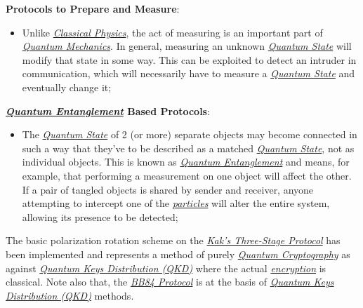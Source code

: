\documentclass[conference]{IEEEtran}
\begin{document}
\vspace{4pt}

\textbf{Protocols to Prepare and Measure}:

\begin{itemize}
    \item Unlike \href{https://en.wikipedia.org/wiki/Classical_physics}{\textit{Classical Physics}}, the act of measuring is an important part of \href{https://en.wikipedia.org/wiki/Quantum_mechanics}{\textit{Quantum Mechanics}}. In general, measuring an unknown \href{https://en.wikipedia.org/wiki/Quantum_state}{\textit{Quantum State}} will modify that state in some way. This can be exploited to detect an intruder in communication, which will necessarily have to measure a \href{https://en.wikipedia.org/wiki/Quantum_state}{\textit{Quantum State}} and eventually change it;
\end{itemize}

\textbf{\href{https://en.wikipedia.org/wiki/Quantum_entanglement}{\textit{Quantum Entanglement}} Based Protocols}:

\begin{itemize}
    \item The \href{https://en.wikipedia.org/wiki/Quantum_state}{\textit{Quantum State}} of 2 (or more) separate objects may become connected in such a way that they've to be described as a matched \href{https://en.wikipedia.org/wiki/Quantum_state}{\textit{Quantum State}}, not as individual objects. This is known as \href{https://en.wikipedia.org/wiki/Quantum_entanglement}{\textit{Quantum Entanglement}} and means, for example, that performing a measurement on one object will affect the other. If a pair of tangled objects is shared by sender and receiver, anyone attempting to intercept one of the \href{https://en.wikipedia.org/wiki/Microparticle}{\textit{particles}} will alter the entire system, allowing its presence to be detected;
\end{itemize}

\vspace{6pt}

The basic polarization rotation scheme on the \href{https://en.wikipedia.org/wiki/Subhash_Kak}{\textit{Kak's Three-Stage Protocol}} has been implemented and represents a method of purely \href{https://en.wikipedia.org/wiki/Quantum_cryptography}{\textit{Quantum Cryptography}} as against \href{https://en.wikipedia.org/wiki/Quantum_key_distribution}{\textit{Quantum Keys Distribution (QKD)}} where the actual \href{https://en.wikipedia.org/wiki/Encryption}{\textit{encryption}} is classical. Note also that, the \href{https://en.wikipedia.org/wiki/BB84}{\textit{BB84 Protocol}} is at the basis of \href{https://en.wikipedia.org/wiki/Quantum_key_distribution}{\textit{Quantum Keys Distribution (QKD)}} methods.
\end{document}
